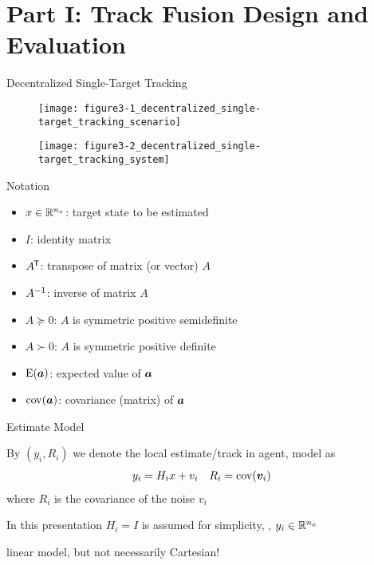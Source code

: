 \documentclass[aspectratio=1610]{beamer}
\begin{document}
\section{Part I: Track Fusion Design and Evaluation}

\begin{frame}{Decentralized Single-Target Tracking }

\begin{figure}
    \centering
    \texttt{[image: figure3-1\_decentralized\_single-target\_tracking\_scenario]}
\end{figure}

\vspace{1em}

\begin{figure}
    \texttt{[image: figure3-2\_decentralized\_single-target\_tracking\_system]}
\end{figure}

\end{frame}


\begin{frame}{Notation}

\begin{itemize}
    \item $x\in{\mathbb{R}}^{n_x}$: target state to be estimated
    \item $I$: identity matrix
    \item $A^{\mkern-1.5mu\mathsf{T}}$: transpose of matrix (or vector) $A$
    \item $A^{-1}$: inverse of matrix $A$
    \item $A\succeq0$: $A$ is symmetric positive semidefinite
    \item $A\succ0$: $A$ is symmetric positive definite
    \item $\operatorname*{\rm E}(\bm{a})$: expected value of $\bm{a}$
    \item $\operatorname*{\rm cov}(\bm{a})$: covariance (matrix) of $\bm{a}$
\end{itemize}

\end{frame}


\begin{frame}{Estimate Model}

By $(y_i,R_i)$ we denote the local estimate/track in \ith agent, model as
\begin{align*}
    y_i &= H_i x + v_i &
    R_i &= \operatorname*{\rm cov}(\bm{v}_i)
\end{align*}
where $R_i$ is the covariance of the noise $v_i$

\vspace{1em}

In this presentation $H_i=I$ is assumed for simplicity, \ie, $y_i\in{\mathbb{R}}^{n_x}$

\vspace{1em}

\alert{linear model, but not necessarily Cartesian!}

\end{frame}
\end{document}
